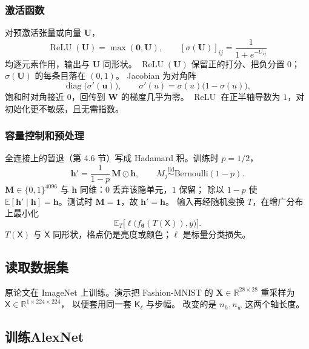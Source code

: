 \subsubsection{激活函数}

对预激活张量或向量 $\bm{U}$，
\[
\operatorname{ReLU}(\bm{U})=\max(\bm{0},\bm{U}),
\qquad
[\sigma(\bm{U})]_{ij}
=
\frac{1}{1+e^{-U_{ij}}}
\]
均逐元素作用，输出与 $\bm{U}$ 同形状。
$\operatorname{ReLU}(\bm{U})$ 保留正的打分、把负分置 $0$；
$\sigma(\bm{U})$ 的每条目落在 $(0,1)$。
Jacobian 为对角阵
\[
\operatorname{diag}\bigl(\sigma'(\bm{u})\bigr),
\qquad
\sigma'(u)=\sigma(u)\bigl(1-\sigma(u)\bigr),
\]
饱和时对角接近 $0$，回传到 $\bm{W}$ 的梯度几乎为零。
$\operatorname{ReLU}$ 在正半轴导数为 $1$，对初始化更不敏感，且无需指数。

\subsubsection{容量控制和预处理}

全连接上的暂退（第 4.6 节）写成 Hadamard 积。训练时 $p=1/2$，
\[
\bm{h}'
=
\frac{1}{1-p}\,
\bm{M}\odot\bm{h},
\qquad
M_j\stackrel{\mathrm{iid}}{\sim}\mathrm{Bernoulli}(1-p).
\]
$\bm{M}\in\{0,1\}^{4096}$ 与 $\bm{h}$ 同维：$0$ 丢弃该隐单元，$1$ 保留；
除以 $1-p$ 使 $\mathbb{E}[\bm{h}'\mid\bm{h}]=\bm{h}$。测试时 $\bm{M}=\bm{1}$，故 $\bm{h}'=\bm{h}$。
输入再经随机变换 $T$，在增广分布上最小化
\[
\mathbb{E}_{T}\bigl[\ell\bigl(f_{\bm{\theta}}(T(\mathsf{X})),y\bigr)\bigr].
\]
$T(\mathsf{X})$ 与 $\mathsf{X}$ 同形状，格点仍是亮度或颜色；$\ell$ 是标量分类损失。

\subsection{读取数据集}

原论文在 ImageNet 上训练。演示把 Fashion-MNIST 的 $\bm{X}\in\mathbb{R}^{28\times 28}$ 重采样为 $\mathsf{X}\in\mathbb{R}^{1\times 224\times 224}$，
以便套用同一套 $\mathsf{K}_\ell$ 与步幅。
改变的是 $n_h,n_w$ 这两个轴长度。

\subsection{训练AlexNet}

